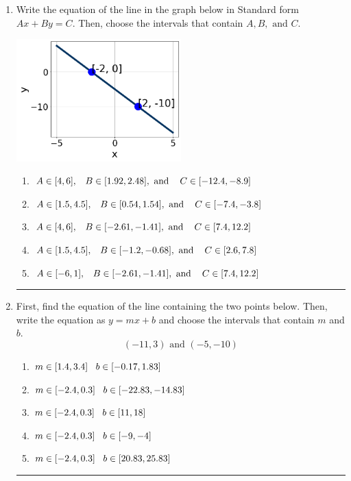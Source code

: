 \documentclass[14pt]{extbook}
\newcommand{\litem}[1]{\item#1\hspace*{-1cm}\rule{\textwidth}{0.4pt}}
\begin{document}
\begin{enumerate}
\litem{
Write the equation of the line in the graph below in Standard form $Ax+By=C$. Then, choose the intervals that contain $A, B, \text{ and } C$.
\begin{center}
    \includegraphics[width=0.5\textwidth]{../Figures/linearGraphToStandardB.png}
\end{center}
\begin{enumerate}[label=\Alph*.]
\item \( A \in [4, 6], \hspace{3mm} B \in [1.92, 2.48], \text{ and } \hspace{3mm} C \in [-12.4, -8.9] \)
\item \( A \in [1.5, 4.5], \hspace{3mm} B \in [0.54, 1.54], \text{ and } \hspace{3mm} C \in [-7.4, -3.8] \)
\item \( A \in [4, 6], \hspace{3mm} B \in [-2.61, -1.41], \text{ and } \hspace{3mm} C \in [7.4, 12.2] \)
\item \( A \in [1.5, 4.5], \hspace{3mm} B \in [-1.2, -0.68], \text{ and } \hspace{3mm} C \in [2.6, 7.8] \)
\item \( A \in [-6, 1], \hspace{3mm} B \in [-2.61, -1.41], \text{ and } \hspace{3mm} C \in [7.4, 12.2] \)

\end{enumerate} }
\litem{
First, find the equation of the line containing the two points below. Then, write the equation as $ y=mx+b $ and choose the intervals that contain $m$ and $b$.\[ (-11, 3) \text{ and } (-5, -10) \]\begin{enumerate}[label=\Alph*.]
\item \( m \in [1.4, 3.4] \hspace*{3mm} b \in [-0.17, 1.83] \)
\item \( m \in [-2.4, 0.3] \hspace*{3mm} b \in [-22.83, -14.83] \)
\item \( m \in [-2.4, 0.3] \hspace*{3mm} b \in [11, 18] \)
\item \( m \in [-2.4, 0.3] \hspace*{3mm} b \in [-9, -4] \)
\item \( m \in [-2.4, 0.3] \hspace*{3mm} b \in [20.83, 25.83] \)


\end{enumerate}}
\end{enumerate}
\end{document}
